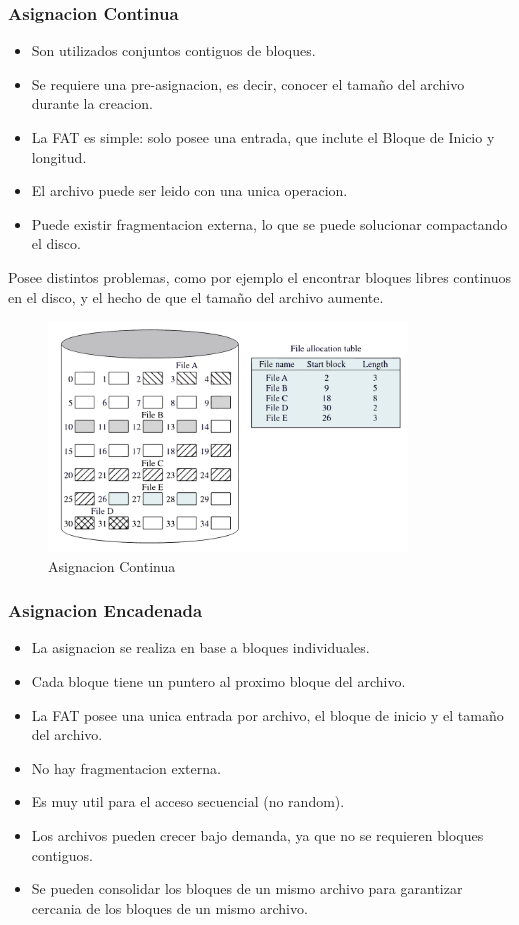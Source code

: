 \documentclass[12pt]{article}
\begin{document}
\subsubsection{Asignacion Continua}
\begin{itemize}
    \item Son utilizados conjuntos contiguos de bloques.
    \item Se requiere una pre-asignacion, es decir, conocer el tamaño del archivo durante la creacion.
    \item La FAT es simple: solo posee una entrada, que inclute el Bloque de Inicio y longitud.
    \item El archivo puede ser leido con una unica operacion.
    \item Puede existir fragmentacion externa, lo que se puede solucionar compactando el disco.
\end{itemize}
Posee distintos problemas, como por ejemplo el encontrar bloques libres continuos en el disco, y el hecho de que el tamaño del archivo aumente.
\vspace{2em}
\begin{figure}[h]
    \begin{center}
        \includegraphics[width=0.85\textwidth]{assets/AsignacionContinua.pdf}
    \end{center}
    \caption{Asignacion Continua}
    \label{fig:1}
\end{figure}

\subsubsection{Asignacion Encadenada}
\begin{itemize}
    \item La asignacion se realiza en base a bloques individuales.
    \item Cada bloque tiene un puntero al proximo bloque del archivo.
    \item La FAT posee una unica entrada por archivo, el bloque de inicio y el tamaño del archivo.
    \item No hay fragmentacion externa.
    \item Es muy util para el acceso secuencial (no random).
    \item Los archivos pueden crecer bajo demanda, ya que no se requieren bloques contiguos.
    \item Se pueden consolidar los bloques de un mismo archivo para garantizar cercania de los bloques de un mismo archivo.
\end{itemize}
\end{document}
